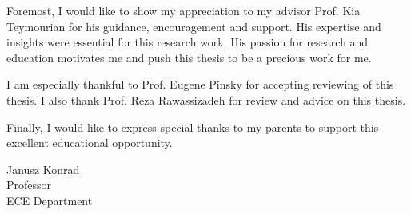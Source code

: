 Foremost, I would like to show my appreciation to my advisor Prof. Kia Teymourian for his guidance, encouragement and support.
His expertise and insights were essential for this research work. His passion for research and education motivates me and push this thesis to be a precious work for me.

I am especially thankful to Prof. Eugene Pinsky for accepting reviewing of this thesis. 
I also thank Prof. Reza Rawassizadeh for review and advice on this thesis.

Finally, I would like to express special thanks to my parents to support this excellent educational opportunity. 

\vskip 1in

\noindent
Janusz Konrad\\
Professor\\
ECE Department